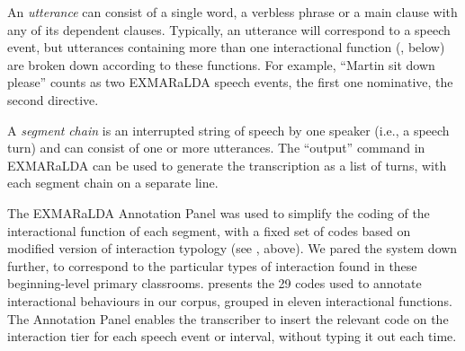 \documentclass[output=paper,colorlinks,citecolor=brown,modfonts,nonflat]{../langscibook}
\begin{document}
An \textit{utterance} can consist of a single word, a verbless phrase or a main clause with any of its dependent clauses. Typically, an utterance will correspond to a speech event, but utterances containing more than one interactional function (, below) are broken down according to these functions. For example, “Martin {\textbar} sit down please” counts as two EXMARaLDA speech events, the first one nominative, the second directive.

A \textit{segment} \textit{chain} is an interrupted string of speech by one speaker (i.e., a speech turn) and can consist of one or more utterances. The “output” command in EXMARaLDA can be used to generate the transcription as a list of turns, with each segment chain on a separate line.

The EXMARaLDA Annotation Panel was used to simplify the coding of the interactional function of each segment, with a fixed set of codes based on  modified version of  interaction typology (see , above). We pared the system down further, to correspond to the particular types of interaction found in these beginning-level primary classrooms.  presents the 29 codes used to annotate interactional behaviours in our corpus, grouped in eleven interactional functions. The Annotation Panel enables the transcriber to insert the relevant code on the interaction tier for each speech event or interval, without typing it out each time.
\end{document}
